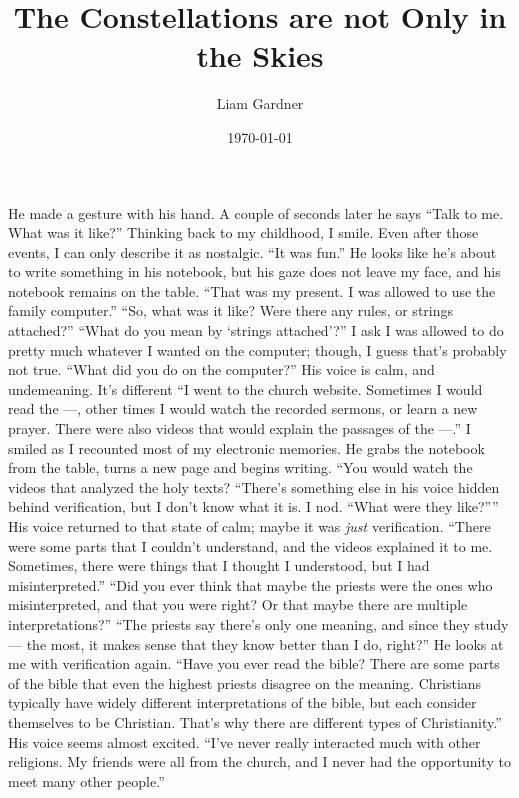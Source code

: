 \documentclass[a4paper, 12pt]{book}
\title{The Constellations are not Only in the Skies}
\author{Liam Gardner}
\date{\today}
\newcommand\tab[1][1cm]{\hspace*{#1}}
\newcommand\nextline{\newline\tab}
\begin{document}
\maketitle
\tab
He made a gesture with his hand. A couple of seconds later he says ``Talk to me. What was it like?''
\nextline
Thinking back to my childhood, I smile. Even after those events, I can only describe it as nostalgic. ``It was fun.'' He looks like he's about to write something in his notebook, but his gaze does not leave my face, and his notebook remains on the table. ``That was my present. I was allowed to use the family computer.''
\nextline
``So, what was it like? Were there any rules, or strings attached?''
\nextline
``What do you mean by `strings attached'?'' I ask I was allowed to do pretty much whatever I wanted on the computer; though, I guess that's probably not true.
\nextline
``What did you do on the computer?'' His voice is calm, and undemeaning. It's different
\nextline
``I went to the church website. Sometimes I would read the ---, other times I would watch the recorded sermons, or learn a new prayer. There were also videos that would explain the passages of the ---.''  I smiled as I recounted most of my electronic memories. He grabs the notebook from the table, turns a new page and begins writing.
\nextline
``You would watch the videos that analyzed the holy texts? ``There's something else in his voice hidden behind verification, but I don't know what it is. I nod. ``What were they like?'''' His voice returned to that state of calm; maybe it was \textit{just} verification.
\nextline
``There were some parts that I couldn't understand, and the videos explained it to me. Sometimes, there were things that I thought I understood, but I had misinterpreted.''
\nextline
``Did you ever think that maybe the priests were the ones who misinterpreted, and that you were right? Or that maybe there are multiple interpretations?''
\nextline
``The priests say there's only one meaning, and since they study --- the most, it makes sense that they know better than I do, right?''
\nextline
He looks at me with verification again. ``Have you ever read the bible? There are some parts of the bible that even the highest priests disagree on the meaning. Christians typically have widely different interpretations of the bible, but each consider themselves to be Christian. That's why there are different types of Christianity.'' His voice seems almost excited.
\nextline
``I've never really interacted much with other religions. My friends were all from the church, and I never had the opportunity to meet many other people.''
\end{document}

